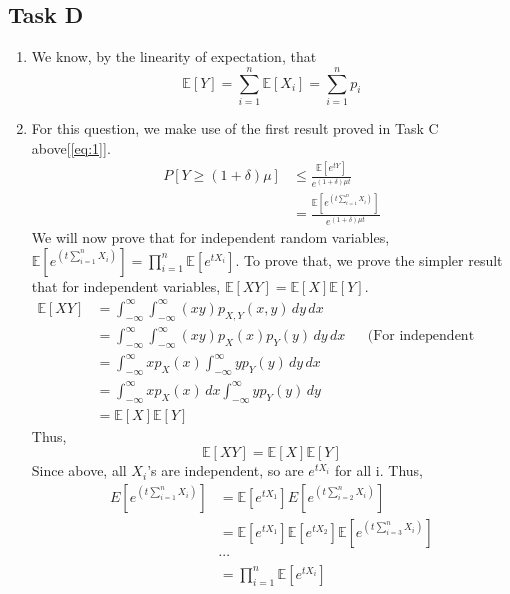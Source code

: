 \subsection{Task D}
\begin{enumerate}
    \item We know, by the linearity of expectation, that \[
        \mathbb{E}[Y]=\sum_{i=1}^{n}\mathbb{E}[X_i]=\sum_{i=1}^{n}p_i
    \]
    \item For this question, we make use of the first result proved in Task C above[\ref{eq:1}]. 
    \begin{align*}       
        \label{Hello}
        P[Y\ge (1+\delta)\mu]&\le \frac{\mathbb{E}[e^{tY}]}{e^{(1+\delta)\mu t}}\\
        &=\frac{\mathbb{E}[e^{\left(t \sum_{i=1}^n X_i\right)}]}{e^{(1+\delta)\mu t}}
    \end{align*}
    We will now prove that for independent random variables, $\mathbb{E}[e^{\left(t\sum_{i=1}^n X_i\right)}]=\prod_{i=1}^n \mathbb{E}[e^{tX_i}]$. To prove that, we prove the simpler result that for independent variables, $\mathbb{E}[XY]=\mathbb{E}[X]\mathbb{E}[Y]$.
    \begin{align*}
        \mathbb{E}[XY]&=\int_{-\infty}^{\infty}\int_{-\infty}^{\infty}(xy)p_{X,Y}(x,y) \, dy \, dx\\
        & = \int_{-\infty}^{\infty}\int_{-\infty}^{\infty}(xy)p_X(x)p_Y(y) \, dy \, dx && \text{(For independent RVs, p(xy)=p(x)p(y))}\\
        &= \int_{-\infty}^{\infty}x p_X(x) \int_{-\infty}^{\infty}yp_Y(y) \, dy \, dx\\
        &= \int_{-\infty}^{\infty}x p_X(x) \, dx \int_{-\infty}^{\infty}y p_Y(y) \, dy\\
        &= \mathbb{E}[X]\mathbb{E}[Y]
    \end{align*}
    Thus,
    \begin{equation*}
        \label{ref:10}
        \mathbb{E}[XY] = \mathbb{E}[X]\mathbb{E}[Y]
    \end{equation*}
    Since above, all $X_i$'s are independent, so are $e^{tX_i}$ for all i. Thus,
    \begin{align*}
        E[e^{\left(t \sum_{i=1}^n X_i\right)}]&=\mathbb{E}[e^{tX_1}]E[e^{\left(t \sum_{i=2}^n X_i\right)}]\\
        &=\mathbb{E}[e^{tX_1}]\mathbb{E}[e^{tX_2}]\mathbb{E}[e^{\left(t \sum_{i=3}^n X_i\right)}]\\
        &\cdots\\
        &=\prod_{i=1}^n \mathbb{E}[e^{tX_i}]

\end{align*}
\end{enumerate}
